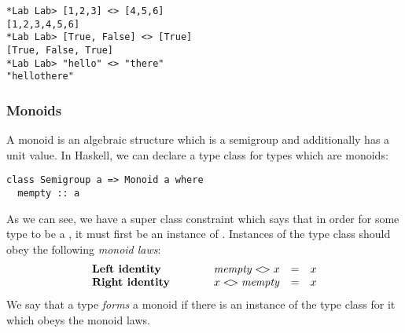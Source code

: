 
\begin{verbatim}
*Lab Lab> [1,2,3] <> [4,5,6]      
[1,2,3,4,5,6]
*Lab Lab> [True, False] <> [True] 
[True, False, True]
*Lab Lab> "hello" <> "there" 
"hellothere"
\end{verbatim}

\taskLine 

\subsubsection{Monoids}

A monoid is an algebraic structure which is a semigroup and additionally has a unit value. In Haskell, we can declare a type class for types which are monoids:
\begin{verbatim}
class Semigroup a => Monoid a where
  mempty :: a
\end{verbatim}
As we can see, we have a super class constraint which says that in order for some type  to be a , it must first be an instance of . Instances of the  type class should obey the following \emph{monoid laws}:
\begin{displaymath}
\begin{array}{lcrcl}
\textbf{Left identity} &\qquad & \mathit{mempty} <\!> x & = & x \\
\textbf{Right identity} &\qquad & x <\!> \mathit{mempty} & = & x 
\end{array}
\end{displaymath}
We say that a type \emph{forms} a monoid if there is an instance of the  type class for it which obeys the monoid laws. 




